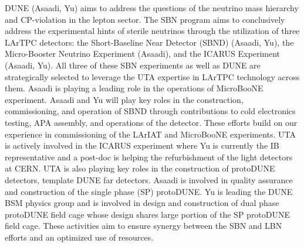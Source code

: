  
 
 DUNE (Asaadi, Yu) aims to address the questions of the neutrino mass hierarchy and CP-violation in the lepton sector. The SBN program aims to conclusively address the experimental hints of sterile neutrinos through the utilization of three LArTPC detectors: the Short-Baseline Near Detector (SBND) (Asaadi, Yu), the Micro-Booster Neutrino Experiment (Asaadi), and the ICARUS Experiment (Asaadi, Yu). All three of these SBN experiments as well as DUNE are strategically selected to leverage the UTA expertise in LArTPC technology across them.
Asaadi is playing a leading role in the operations of MicroBooNE experiment. Asaadi and Yu will play key roles in the construction, commissioning, and operation of SBND through contributions to cold electronics testing, APA assembly, and operations of the detector. These efforts build on our experience in commissioning of the LArIAT and MicroBooNE experiments. UTA is actively involved in the ICARUS experiment where Yu is currently the IB representative and a post-doc is helping the refurbishment of the light detectors at CERN.  UTA is also playing key roles in the construction of protoDUNE detectors, template DUNE far detectors. Asaadi is involved in quality assurance and construction of the single phase (SP) protoDUNE. Yu is leading the DUNE BSM physics group and is involved in design and construction of dual phase protoDUNE field cage whose design shares large portion of the SP protoDUNE field cage. These activities aim to ensure synergy between the SBN and LBN efforts and an optimized use of resources.



